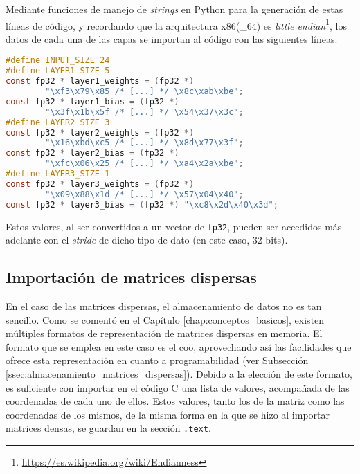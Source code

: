 Mediante funciones de manejo de \textit{strings} en Python para la generación de estas líneas de código, y recordando que la arquitectura x86(\_64) es \textit{little endian}\footnote{\url{https://es.wikipedia.org/wiki/Endianness}}, los datos de cada una de las capas se importan al código con las siguientes líneas:\medskip
\begin{lstlisting}[language=C]
#define INPUT_SIZE 24
#define LAYER1_SIZE 5
const fp32 * layer1_weights = (fp32 *)
        "\xf3\x79\x85 /* [...] */ \x8c\xab\xbe";
const fp32 * layer1_bias = (fp32 *)
        "\x3f\x1b\x5f /* [...] */ \x54\x37\x3c";
#define LAYER2_SIZE 3
const fp32 * layer2_weights = (fp32 *)
        "\x16\xbd\xc5 /* [...] */ \x8d\x77\x3f";
const fp32 * layer2_bias = (fp32 *)
        "\xfc\x06\x25 /* [...] */ \xa4\x2a\xbe";
#define LAYER3_SIZE 1
const fp32 * layer3_weights = (fp32 *)
        "\x09\x88\x1d /* [...] */ \x57\x04\x40";
const fp32 * layer3_bias = (fp32 *) "\xc8\x2d\x40\x3d";
\end{lstlisting}

Estos valores, al ser convertidos a un vector de \texttt{fp32}, pueden ser accedidos más adelante con el \textit{stride} de dicho tipo de dato (en este caso, 32 bits).

\subsection{Importación de matrices dispersas}
\label{ssec:importacion_matrices_dispersas}
En el caso de las matrices dispersas, el almacenamiento de datos no es tan sencillo. Como se comentó en el Capítulo \ref{chap:conceptos_basicos}, existen múltiples formatos de representación de matrices dispersas en memoria. El formato que se emplea en este caso es el \acrshort{coo}, aprovechando así las facilidades que ofrece esta representación en cuanto a programabilidad (ver Subsección \ref{ssec:almacenamiento_matrices_dispersas}). Debido a la elección de este formato, es suficiente con importar en el código C una lista de valores, acompañada de las coordenadas de cada uno de ellos. Estos valores, tanto los de la matriz como las coordenadas de los mismos, de la misma forma en la que se hizo al importar matrices densas, se guardan en la sección \texttt{.text}.

